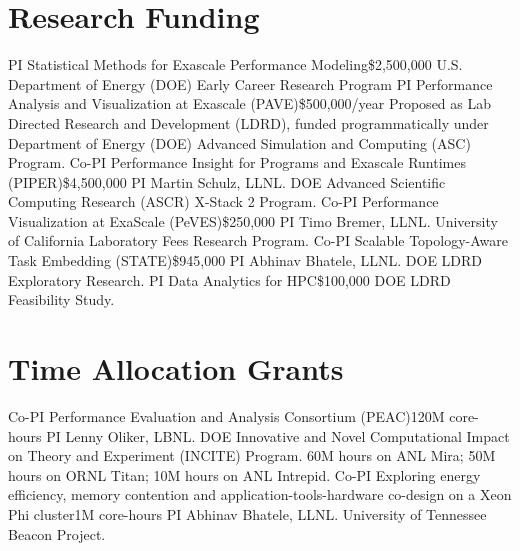 \section{Research Funding}
		{PI}
		{Statistical Methods for Exascale Performance Modeling}{}{\$2,500,000}
		{U.S. Department of Energy (DOE) Early Career Research Program}
		{PI}
		{Performance Analysis and Visualization at Exascale (PAVE)}{}{\$500,000/year}
		{Proposed as Lab Directed Research and Development (LDRD), funded
		 programmatically under\newline
		 Department of Energy (DOE) Advanced Simulation and Computing (ASC) Program.}
		{Co-PI}
		{Performance Insight for Programs and Exascale Runtimes (PIPER)}{}{\$4,500,000}
		{PI Martin Schulz, LLNL. DOE Advanced Scientific Computing Research (ASCR)
		 X-Stack 2 Program.}
		{Co-PI}
		{Performance Visualization at ExaScale (PeVES)}{}{\$250,000}
		{PI Timo Bremer, LLNL. University of California Laboratory Fees Research Program.}
		{Co-PI}
		{Scalable Topology-Aware Task Embedding (STATE)}{}{\$945,000}
		{PI Abhinav Bhatele, LLNL. DOE LDRD Exploratory Research.}
		{PI}
		{Data Analytics for HPC}{}{\$100,000}
		{DOE LDRD Feasibility Study.}

\section{Time Allocation Grants}
		{Co-PI}
		{Performance Evaluation and Analysis Consortium (PEAC)}{}{120M core-hours}
		{PI Lenny Oliker, LBNL.  DOE Innovative and Novel Computational Impact on Theory
		 and Experiment (INCITE) Program.  60M hours on ANL Mira; 50M hours on ORNL Titan;
		 10M hours on ANL Intrepid.}
	{Co-PI}
	{Exploring energy efficiency, memory contention and application-tools-hardware
		co-design on a Xeon Phi cluster}{}{1M core-hours}
	{PI Abhinav Bhatele, LLNL.  University of Tennessee Beacon Project.}
